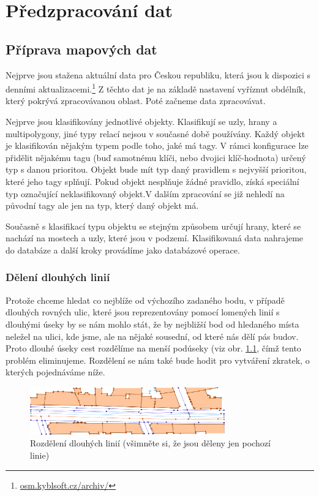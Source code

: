\chapter{Předzpracování dat}


\section{Příprava mapových dat}
Nejprve jsou stažena aktuální data pro Českou republiku, která jsou k dispozici
s denními aktualizacemi.\footnote{\url{osm.kyblsoft.cz/archiv/}} Z těchto dat je
na základě nastavení vyříznut obdélník, který pokrývá zpracovávanou oblast. Poté
začneme data zpracovávat.

Nejprve jsou klasifikovány jednotlivé objekty. Klasifikují se uzly, hrany a
multipolygony, jiné typy relací nejsou v současné době používány. Každý objekt
je klasifikován nějakým typem podle toho, jaké má tagy. V rámci konfigurace lze
přidělit nějakému tagu (buď samotnému klíči, nebo dvojici klíč-hodnota) určený
typ s danou prioritou. Objekt bude mít typ daný pravidlem s nejvyšší prioritou,
které jeho tagy splňují. Pokud objekt nesplňuje žádné pravidlo, získá speciální
typ označující neklasifikovaný objekt.V dalším zpracování se již nehledí na
původní tagy ale jen na typ, který daný objekt má.

Současně s klasifikací typu objektu se stejným způsobem určují hrany, které se
nachází na mostech a uzly, které jsou v podzemí. Klasifikovaná data nahrajeme do
databáze a další kroky provádíme jako databázové operace. 

\subsection{Dělení dlouhých linií}
Protože chceme hledat co nejblíže od výchozího zadaného bodu, v případě dlouhých
rovných ulic, které jsou reprezentovány pomocí lomených linií s dlouhými úseky
by se nám mohlo stát, že by nejbližší bod od hledaného místa neležel na ulici,
kde jsme, ale na nějaké sousední, od které nás dělí pás budov. Proto dlouhé
úseky cest rozdělíme na menší podúseky (viz obr. \ref{fig:deleni}, čímž tento problém eliminujeme.
Rozdělení se nám také bude hodit pro vytváření zkratek, o kterých pojednáváme
níže.

\begin{figure}
  \centering
    \includegraphics[width=0.75\textwidth]{../img/deleni.pdf}
  \caption{Rozdělení dlouhých linií (všimněte si, že jsou děleny jen pochozí
  linie)}
  \label{fig:deleni}
\end{figure}


